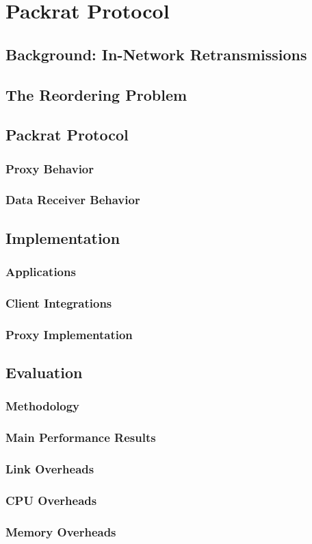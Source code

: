 \chapter{Packrat Protocol}

\section{Background: In-Network Retransmissions}

\section{The Reordering Problem}

\section{Packrat Protocol}
\subsection{Proxy Behavior}
\subsection{Data Receiver Behavior}

\section{Implementation}

\subsection{Applications}
\subsection{Client Integrations}
\subsection{Proxy Implementation}

\section{Evaluation}

\subsection{Methodology}
\subsection{Main Performance Results}
\subsection{Link Overheads}
\subsection{CPU Overheads}
\subsection{Memory Overheads}
